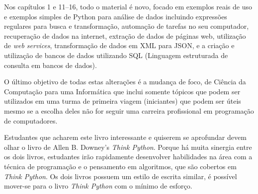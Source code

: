 Nos capítulos 1 e 11--16, todo o material é novo, focado em exemplos reais de
uso e exemplos simples de Python para análise de dados incluindo expressões
regulares para busca e transformação, automação de tarefas no seu computador,
recuperação de dados na internet, extração de dados de páginas web,
utilização de {\it web services}, transformação de dados em XML para JSON, e a
criação e utilização de bancos de dados utilizando SQL (Linguagem estruturada
de consulta em bancos de dados).


O último objetivo de todas estas alterações é a mudança de foco, de Ciência da
Computação para uma Informática que inclui somente tópicos que podem ser
utilizados em uma turma de primeira viagem (iniciantes) que podem ser úteis
mesmo se a escolha deles não for seguir uma carreira profissional em
programação de computadores.


Estudantes que acharem este livro interessante e quiserem se aprofundar devem
olhar o livro de Allen B. Downey's \emph{Think Python}. Porque há muita
sinergia entre os dois livros, estudantes irão rapidamente desenvolver
habilidades na área com a técnica de programação e o pensamento em algoritmos,
que são cobertos em \emph{Think Python}. Os dois livros possuem um estilo de
escrita similar, é possível mover-se para o livro \emph{Think Python} com o
mínimo de esforço.


